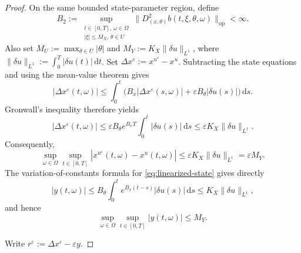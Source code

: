 \documentclass[11pt]{amsart}
\numberwithin{equation}{section} %
\newcommand{\dd}{\mathrm{d}}
\theoremstyle{remark}
\begin{document}
\begin{proof}
On the same bounded state-parameter region, define
\begin{equation}
\label{eq:uniform-b-derivative-bound}
B_2:=\sup_{\substack{t\in[0,T],\,\omega\in\Omega\\
 |\xi|\le M_X,\,\theta\in U}}
\|D^2_{(x,\theta)}b(t,\xi,\theta,\omega)\|_{\mathrm{op}}<\infty.
\end{equation}
Also set $M_U:=\max_{\theta\in U}|\theta|$ and
$M_Y:=K_X\|\delta u\|_{L^1}$, where
$\|\delta u\|_{L^1}:=\int_0^T|\delta u(t)|\,\dd t$.
Set $\Delta x^\varepsilon:=x^{u^\varepsilon}-x^u$.
Subtracting the state equations and using the mean-value theorem gives
\[
|\Delta x^\varepsilon(t,\omega)|
\le\int_0^t\bigl(B_x|\Delta x^\varepsilon(s,\omega)|
+\varepsilon B_\theta|\delta u(s)|\bigr)\,\dd s.
\]
Gronwall's inequality therefore yields
\[
|\Delta x^\varepsilon(t,\omega)|
\le\varepsilon B_\theta e^{B_xT}\int_0^t|\delta u(s)|\,\dd s
\le\varepsilon K_X\|\delta u\|_{L^1}.
\]
Consequently,
\begin{equation}
\label{eq:state-perturbation-bound}
\sup_{\omega\in\Omega}\sup_{t\in[0,T]}
|x^{u^\varepsilon}(t,\omega)-x^u(t,\omega)|
\le\varepsilon K_X\|\delta u\|_{L^1}
=\varepsilon M_Y.
\end{equation}
The variation-of-constants formula for \eqref{eq:linearized-state}
gives directly
\[
|y(t,\omega)|\le B_\theta\int_0^t e^{B_x(t-s)}|\delta u(s)|\,\dd s
\le K_X\|\delta u\|_{L^1},
\]
and hence
\begin{equation}
\label{eq:linearized-state-bound}
\sup_{\omega\in\Omega}\sup_{t\in[0,T]}|y(t,\omega)|\le M_Y.
\end{equation}

Write $r^\varepsilon:=\Delta x^\varepsilon-\varepsilon y$.


\end{proof}
\end{document}
